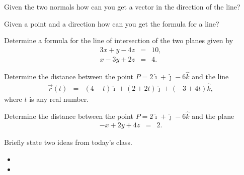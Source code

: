 \begin{problem}
\begin{subproblem}
  \item Given the two normals how can you get a vector in the direction of the line?
    \vspace{3em}

  \item Given a point and a direction how can you get the formula for a line?
    \vspace{3em}

  \item Determine a formula for the line of intersection of the two planes given by
  \begin{eqnarray*}
    3x + y - 4z & = & 10, \\
    x  - 3y + 2z & = & 4.
  \end{eqnarray*}
    \vfill

  \end{subproblem}
  \clearpage

  \item Determine the distance between the point $P=2\hat{\imath} + \hat{\jmath} - 6\hat{k}$ and the line
  \begin{eqnarray*}
    \vec{r}(t) & = & (4-t)\hat{\imath} + (2+2t)\hat{\jmath} + (-3+4t)\hat{k},
  \end{eqnarray*}
  where $t$ is any real number.
  \vfill

  \item Determine the distance between the point $P=2\hat{\imath} + \hat{\jmath} - 6\hat{k}$ and the plane
  \begin{eqnarray*}
    -x + 2y + 4z & = & 2.
  \end{eqnarray*}
  \vfill


\end{problem}


\postClass

\begin{problem}
\item Briefly state two ideas from today's class.
  \begin{itemize}
  \item
  \item
  \end{itemize}
\item
  \begin{subproblem}
    \item
  \end{subproblem}
\end{problem}




